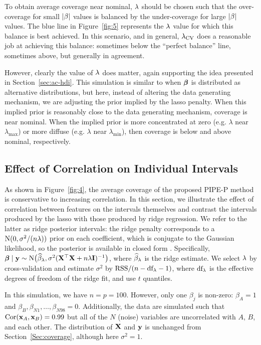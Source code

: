 To obtain average coverage near nominal, $\lambda$ should be chosen such that the over-coverage for small $\left\lvert\beta\right\rvert$ values is balanced by the under-coverage for large $\left\lvert\beta\right\rvert$ values. The blue line in Figure~\ref{fig:5} represents the $\lambda$ value for which this balance is best achieved. In this scenario, and in general, $\lambda_{\textrm{CV}}$ does a reasonable job at achieving this balance: sometimes below the ``perfect balance'' line, sometimes above, but generally in agreement.

However, clearly the value of $\lambda$ does matter, again supporting the idea presented in Section~\ref{sec:ac-hdi}. This simulation is similar to when $\boldsymbol{\beta}$ is distributed as alternative distributions, but here, instead of altering the data generating mechanism, we are adjusting the prior implied by the lasso penalty. When this implied prior is reasonably close to the data generating mechanism, coverage is near nominal. When the implied prior is more concentrated at zero (e.g. $\lambda$ near $\lambda_{\max}$) or more diffuse (e.g. $\lambda$ near $\lambda_{\min}$), then coverage is below and above nominal, respectively.

\subsection{Effect of Correlation on Individual Intervals}
\label{Sec:Ridge}

As shown in Figure~\ref{fig:4}, the average coverage of the proposed PIPE-P method is conservative to increasing correlation. In this section, we illustrate the effect of correlation between features on the intervals themselves and contrast the intervals produced by the lasso with those produced by ridge regression. We refer to the latter as ridge posterior intervals: the ridge penalty corresponds to a $\textrm{N}(0, \sigma^2/(n\lambda))$ prior on each coefficient, which is conjugate to the Gaussian likelihood, so the posterior is available in closed form \citep[Section 3.4.1]{Hastie2009}. Specifically, $\boldsymbol{\beta} \mid \mathbf{y} \sim \textrm{N}\big(\widehat{\beta}_{\lambda}, \sigma^2(\mathbf{X}^\top\mathbf{X} + n\lambda \mathbf{I})^{-1}\big)$, where $\widehat{\beta}_{\lambda}$ is the ridge estimate. We select $\lambda$ by cross-validation and estimate $\sigma^2$ by $\text{RSS}/(n - \text{df}_{\lambda} - 1)$, where $\text{df}_{\lambda}$ is the effective degrees of freedom of the ridge fit, and use $t$ quantiles.

In this simulation, we have $n = p = 100$. However, only one $\beta_j$ is non-zero: $\beta_{A} = 1$ and $\beta_{B}, \beta_{N1}, \ldots, \beta_{N98} = 0$. Additionally, the data are simulated such that $\textrm{Cor}(\mathbf{x}_{A}, \mathbf{x}_{B}) = 0.99$ but all of the $N$ (noise) variables are uncorrelated with $A$, $B$, and each other. The distribution of $\mathbf{X}$ and $\mathbf{y}$ is unchanged from Section~\ref{Sec:coverage}, although here $\sigma^2 = 1$.

